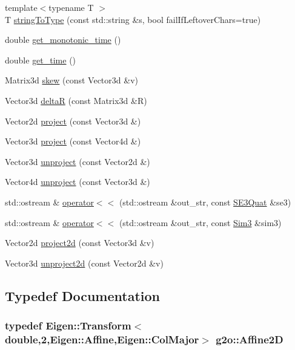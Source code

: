 \begin{DoxyCompactItemize}
\item 
{\footnotesize template$<$typename T $>$ }\\T \hyperlink{group__utils_ga9dac39a213d269b8d68fb698bf82873a}{string\+To\+Type} (const std\+::string \&s, bool fail\+If\+Leftover\+Chars=true)
\item 
double \hyperlink{namespaceg2o_aa64237935c7d8411b4369234a5f661ea}{get\+\_\+monotonic\+\_\+time} ()
\item 
double \hyperlink{namespaceg2o_a6baa8fdfd973b5b970df14f14fd5d844}{get\+\_\+time} ()
\item 
Matrix3d \hyperlink{namespaceg2o_adb3143a37b9bc002f4f7b6423061ef81}{skew} (const Vector3d \&v)
\item 
Vector3d \hyperlink{namespaceg2o_a2e39915fb420fd7dc2d3802435e4a6a9}{deltaR} (const Matrix3d \&R)
\item 
Vector2d \hyperlink{namespaceg2o_a45b89a0471d862c09167e7ce718df000}{project} (const Vector3d \&)
\item 
Vector3d \hyperlink{namespaceg2o_a3d337768fe9db907df691e3624ca4e1e}{project} (const Vector4d \&)
\item 
Vector3d \hyperlink{namespaceg2o_ab8746174c3f8c25af4188fc24b2dc3d4}{unproject} (const Vector2d \&)
\item 
Vector4d \hyperlink{namespaceg2o_a46785a7417bd703d67107c2b5f649007}{unproject} (const Vector3d \&)
\item 
std\+::ostream \& \hyperlink{namespaceg2o_a613d60098b4ebe03626c13f9432b7834}{operator$<$$<$} (std\+::ostream \&out\+\_\+str, const \hyperlink{classg2o_1_1SE3Quat}{S\+E3\+Quat} \&se3)
\item 
std\+::ostream \& \hyperlink{namespaceg2o_a8ab958f2ec4a80e849def091d38f1131}{operator$<$$<$} (std\+::ostream \&out\+\_\+str, const \hyperlink{structg2o_1_1Sim3}{Sim3} \&sim3)
\item 
Vector2d \hyperlink{namespaceg2o_acc3b6db544c564fb29c4ea60c1fcb775}{project2d} (const Vector3d \&v)
\item 
Vector3d \hyperlink{namespaceg2o_a6edbda6681de50df71048c5b72778998}{unproject2d} (const Vector2d \&v)
\end{DoxyCompactItemize}


\subsection{Typedef Documentation}
\subsubsection[{\texorpdfstring{Affine2D}{Affine2D}}]{\setlength{\rightskip}{0pt plus 5cm}typedef Eigen\+::\+Transform$<$double,2,Eigen\+::\+Affine,Eigen\+::\+Col\+Major$>$ {\bf g2o\+::\+Affine2D}}\hypertarget{namespaceg2o_ad7410532a9e2e255e93781c6beb0feb8}{}\label{namespaceg2o_ad7410532a9e2e255e93781c6beb0feb8}


